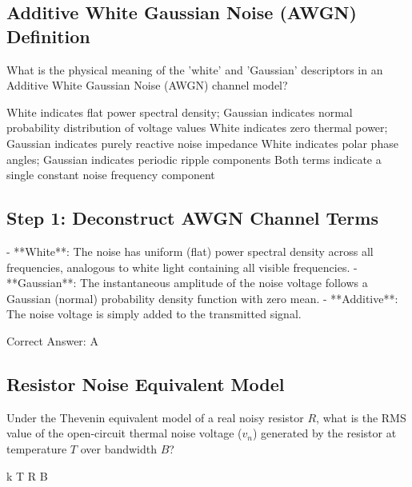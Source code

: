 \clearpage

\subsection{Additive White Gaussian Noise (AWGN) Definition}

What is the physical meaning of the 'white' and 'Gaussian' descriptors in an Additive White Gaussian Noise (AWGN) channel model?

\begin{choices}
    \correctchoice White indicates flat power spectral density; Gaussian indicates normal probability distribution of voltage values
    \choice White indicates zero thermal power; Gaussian indicates purely reactive noise impedance
    \choice White indicates polar phase angles; Gaussian indicates periodic ripple components
    \choice Both terms indicate a single constant noise frequency component
\end{choices}

\begin{solution}

\subsection*{Step 1: Deconstruct AWGN Channel Terms}
- **White**: The noise has uniform (flat) power spectral density across all frequencies, analogous to white light containing all visible frequencies.
- **Gaussian**: The instantaneous amplitude of the noise voltage follows a Gaussian (normal) probability density function with zero mean.
- **Additive**: The noise voltage is simply added to the transmitted signal.

Correct Answer: A
\end{solution}

\clearpage

\subsection{Resistor Noise Equivalent Model}

Under the Thevenin equivalent model of a real noisy resistor $R$, what is the RMS value of the open-circuit thermal noise voltage ($v_n$) generated by the resistor at temperature $T$ over bandwidth $B$?

\begin{choices}
    \correctchoice {}
     k T R B
    \choice {}
    \choice {}
\end{choices}

